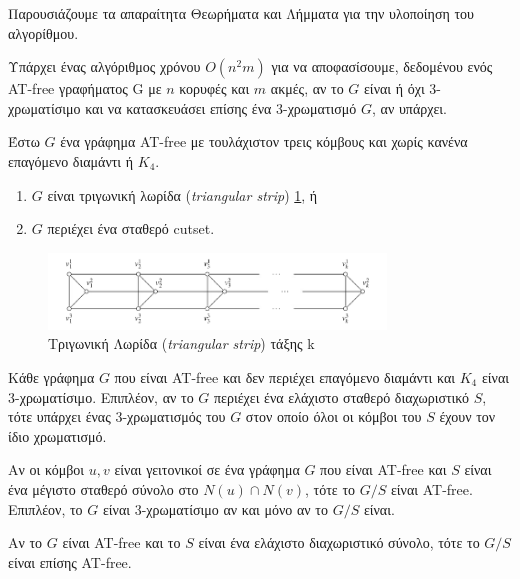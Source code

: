 Παρουσιάζουμε τα απαραίτητα Θεωρήματα και Λήμματα για την υλοποίηση του αλγορίθμου.

\begin{theorem}
	\label{theor:1.1}
	Υπάρχει ένας αλγόριθμος χρόνου $O(n^2m)$ για να αποφασίσουμε, δεδομένου ενός AT-free γραφήματος
	G με $n$ κορυφές και $m$ ακμές, αν το $G$ είναι ή όχι 3-χρωματίσιμο και να κατασκευάσει επίσης
	ένα 3-χρωματισμό $G$, αν υπάρχει.
\end{theorem}

\begin{theorem}
	\label{theor:1.2}
	Έστω $G$ ένα γράφημα AT-free με τουλάχιστον τρεις κόμβους και χωρίς κανένα επαγόμενο διαμάντι ή $K_4$.
	\begin{enumerate}
		\item $G$ είναι τριγωνική λωρίδα (\textit{triangular strip}) \ref{fig:triangular-strip}, ή
		\item $G$ περιέχει ένα σταθερό cutset.
	\end{enumerate}
\end{theorem}


\begin{figure}[H]
	\centering
	\includegraphics[width=0.8\textwidth]{pictures/triangular-strip.png} 
	\caption{Tριγωνική Λωρίδα (\textit{triangular strip}) τάξης k}
	\label{fig:triangular-strip}
\end{figure}

\begin{theorem}
	\label{theor:1.3}
	Κάθε γράφημα $G$ που είναι AT-free και δεν περιέχει επαγόμενο διαμάντι και $K_4$ είναι 3-χρωματίσιμο. Επιπλέον, αν το $G$ περιέχει ένα ελάχιστο σταθερό διαχωριστικό $S$, τότε υπάρχει ένας 3-χρωματισμός του $G$ στον οποίο όλοι οι κόμβοι του $S$ έχουν τον ίδιο χρωματισμό.
\end{theorem}

\begin{theorem}
	\label{theor:3.1}
	Αν οι κόμβοι $u, v$ είναι γειτονικοί σε ένα γράφημα $G$ που είναι AT-free και $S$ είναι ένα μέγιστο σταθερό σύνολο στο $N(u) \cap N(v)$, τότε το $G/S$ είναι AT-free. Επιπλέον, το $G$ είναι 3-χρωματίσιμο αν και μόνο αν το $G/S$ είναι.
\end{theorem}


\begin{lemma}
	\label{lemma:3.4}
	Αν το $G$ είναι AT-free και το $S$ είναι ένα ελάχιστο διαχωριστικό σύνολο, τότε το $G/S$ είναι επίσης AT-free.
\end{lemma}

